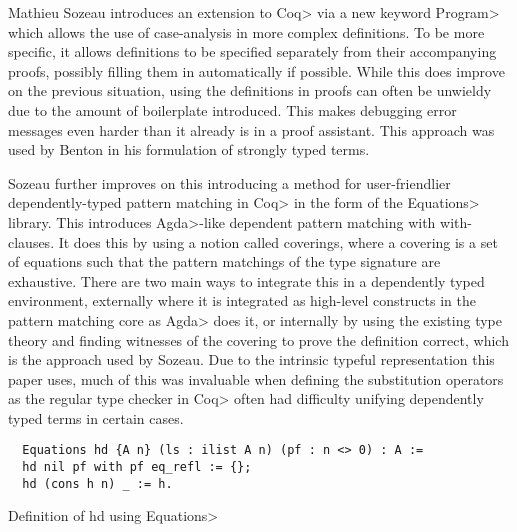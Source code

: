 Mathieu Sozeau introduces an extension to \<Coq> via a new keyword \<Program> which allows the use of case-analysis in more complex definitions\cite{10.5555/1789277.1789293}\cite{Sozeau2007}.
To be more specific, it allows definitions to be specified separately from their accompanying proofs, possibly filling them in automatically if possible.
While this does improve on the previous situation, using the definitions in proofs can often be unwieldy due to the amount of boilerplate introduced.
This makes debugging error messages even harder than it already is in a proof assistant. This approach was used by Benton in his formulation of strongly typed terms.

Sozeau further improves on this introducing a method for user-friendlier dependently-typed pattern matching in \<Coq> in the form of the \<Equations> library\cite{Sozeau2010}\cite{Sozeau2019}.
This introduces \<Agda>-like dependent pattern matching with with-clauses.
It does this by using a notion called coverings, where a covering is a set of equations such that the pattern matchings of the type signature are exhaustive.
There are two main ways to integrate this in a dependently typed environment, externally where it is integrated as high-level constructs in the pattern matching core as \<Agda> does it, or internally by using the existing type theory and finding witnesses of the covering to prove the definition correct, which is the approach used by Sozeau.
Due to the intrinsic typeful representation this paper uses, much of this was invaluable when defining the substitution operators as the regular type checker in \<Coq> often had difficulty unifying dependently typed terms in certain cases.

\begin{listing}
  \begin{verbatim}
  Equations hd {A n} (ls : ilist A n) (pf : n <> 0) : A :=
  hd nil pf with pf eq_refl := {};
  hd (cons h n) _ := h.
  \end{verbatim}
  \caption{Definition of hd using \<Equations>}
  \label{lst:dt_ilist_hd_equations}
\end{listing}

